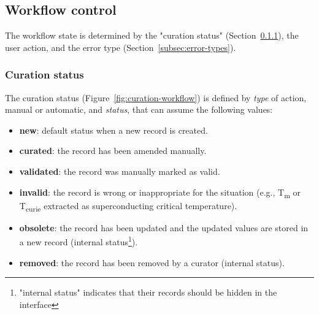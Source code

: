 \documentclass[]{interact}
\theoremstyle{plain} %
\theoremstyle{definition}
\theoremstyle{remark}
\begin{document}


\subsection{Workflow control}
\label{subsec:workflow-control}
The workflow state is determined by the "curation status" (Section~\ref{subsec:curation-status}), the user action, and the error type (Section~\ref{subsec:error-types}).

\subsubsection{Curation status} 
\label{subsec:curation-status}
The curation status (Figure~\ref{fig:curation-workflow}) is defined by \emph{type} of action, manual or automatic, and \emph{status}, that can assume the following values: 
\begin{itemize}
    \item \textbf{new}: default status when a new record is created.
    \item \textbf{curated}: the record has been amended manually.
    \item \textbf{validated}: the record was manually marked as valid.
    \item \textbf{invalid}: the record is wrong or inappropriate for the situation (e.g., T\textsubscript{m} or T\textsubscript{curie} extracted as superconducting critical temperature).
    \item \textbf{obsolete}: the record has been updated and the updated values are stored in a new record (internal status\footnote{"internal status" indicates that their records should be hidden in the interface}).
    \item \textbf{removed}: the record has been removed by a curator (internal status).
\end{itemize} 
    

\end{document}
